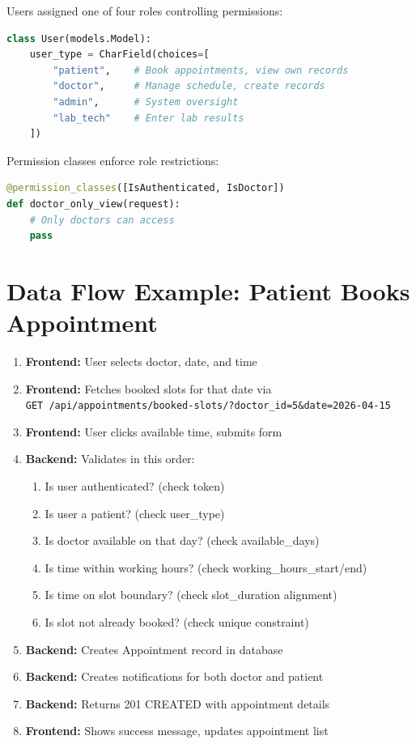 \documentclass[11pt,a4paper,twoside]{report}
\begin{document}
Users assigned one of four roles controlling permissions:

\begin{lstlisting}[language=Python]
class User(models.Model):
    user_type = CharField(choices=[
        "patient",    # Book appointments, view own records
        "doctor",     # Manage schedule, create records
        "admin",      # System oversight
        "lab_tech"    # Enter lab results
    ])
\end{lstlisting}

Permission classes enforce role restrictions:

\begin{lstlisting}[language=Python]
@permission_classes([IsAuthenticated, IsDoctor])
def doctor_only_view(request):
    # Only doctors can access
    pass
\end{lstlisting}

\newpage

\section{Data Flow Example: Patient Books Appointment}

\begin{enumerate}
    \item \textbf{Frontend:} User selects doctor, date, and time
    \item \textbf{Frontend:} Fetches booked slots for that date via \\ \texttt{GET /api/appointments/booked-slots/?doctor\_id=5\&date=2026-04-15}
    \item \textbf{Frontend:} User clicks available time, submits form
    \item \textbf{Backend:} Validates in this order:
    \begin{enumerate}
        \item Is user authenticated? (check token)
        \item Is user a patient? (check user\_type)
        \item Is doctor available on that day? (check available\_days)
        \item Is time within working hours? (check working\_hours\_start/end)
        \item Is time on slot boundary? (check slot\_duration alignment)
        \item Is slot not already booked? (check unique constraint)
    \end{enumerate}
    \item \textbf{Backend:} Creates Appointment record in database
    \item \textbf{Backend:} Creates notifications for both doctor and patient
    \item \textbf{Backend:} Returns 201 CREATED with appointment details
    \item \textbf{Frontend:} Shows success message, updates appointment list
\end{enumerate}
\end{document}
